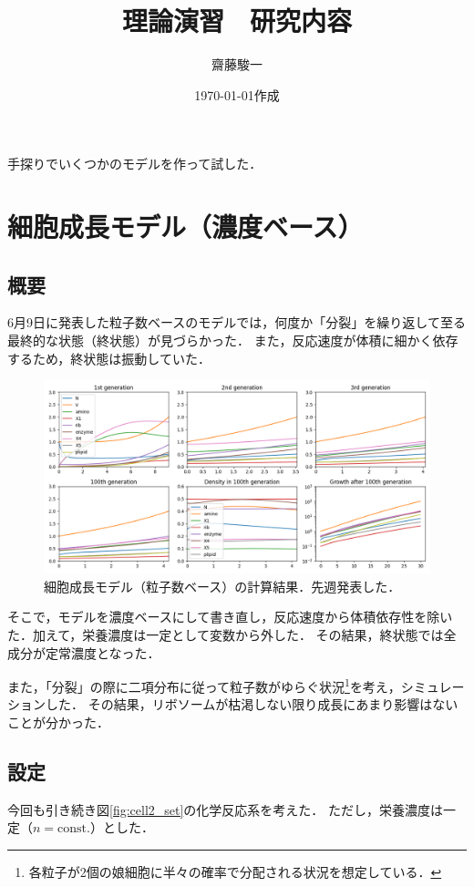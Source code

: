 \documentclass[a4paper,11pt]{jsarticle}
\begin{document}
\title{理論演習　研究内容}
\author{齋藤駿一}
\date{\today 作成}
\maketitle

手探りでいくつかのモデルを作って試した．

\section{細胞成長モデル（濃度ベース）}
\subsection{概要}
6月9日に発表した粒子数ベースのモデルでは，何度か「分裂」を繰り返して至る最終的な状態（終状態）が見づらかった．
また，反応速度が体積に細かく依存するため，終状態は振動していた．

\begin{figure}[htbp]
  \centering
  \includegraphics[width=\columnwidth]{cell_100gen.png}
  \caption{細胞成長モデル（粒子数ベース）の計算結果．先週発表した．}
  \label{fig:cell1}
\end{figure}

そこで，モデルを濃度ベースにして書き直し，反応速度から体積依存性を除いた．加えて，栄養濃度は一定として変数から外した．
その結果，終状態では全成分が定常濃度となった．


また，「分裂」の際に二項分布に従って粒子数がゆらぐ状況\footnote{各粒子が2個の娘細胞に半々の確率で分配される状況を想定している．}を考え，シミュレーションした．
その結果，リボソームが枯渇しない限り成長にあまり影響はないことが分かった．

\subsection{設定}
今回も引き続き図\ref{fig:cell2_set}の化学反応系を考えた．
ただし，栄養濃度は一定（$n=\mathrm{const.}$）とした．
\end{document}
